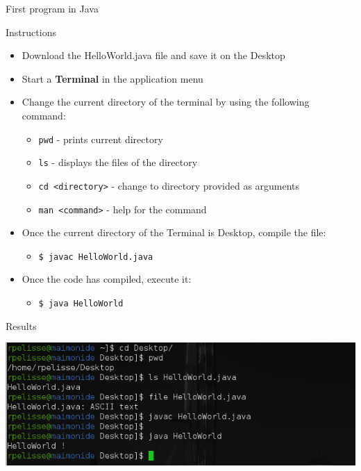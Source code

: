 {  \begin{frame}{First program in Java}
    \begin{block}{Instructions}
      \begin{itemize}
        \item Download the HelloWorld.java file and save it on the Desktop
        \item Start a \textbf{Terminal} in the application menu
        \item Change the current directory of the terminal by using the following command:
        \begin{itemize}
          \item \texttt{pwd} - prints current directory
          \item \texttt{ls} - displays the files of the directory
          \item \texttt{cd <directory>} - change to directory provided as arguments
          \item \texttt{man <command>} - help for the command
        \end{itemize}
        \item Once the current directory of the Terminal is Desktop, compile the file:
        \begin{itemize}
          \item \texttt{\$ javac HelloWorld.java}
        \end{itemize}
        \item Once the code has compiled, execute it:
        \begin{itemize}
          \item \texttt{\$ java HelloWorld}
        \end{itemize}
      \end{itemize}
    \end{block}
  \end{frame}

  \begin{frame}{Results}
   \begin{center}
     \includegraphics[scale=0.5]{img/hello-world.png}
   \end{center}
  \end{frame}

}

